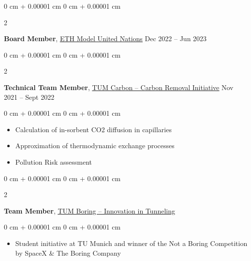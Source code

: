 \documentclass[10pt, letterpaper]{article}
\newenvironment{highlights}{
    \begin{itemize}[
        topsep=0.10 cm,
        parsep=0.10 cm,
        partopsep=0pt,
        itemsep=0pt,
        leftmargin=0 cm + 10pt
    ]
}{
    \end{itemize}
} %
\newenvironment{onecolentry}{
    \begin{adjustwidth}{
        0 cm + 0.00001 cm
    }{
        0 cm + 0.00001 cm
    }
}{
    \end{adjustwidth}
} %
\newenvironment{twocolentry}[2][]{
    \onecolentry
    \def\secondColumn{#2}
    \setcolumnwidth{\fill, 4.5 cm}
    \begin{paracol}{2}
}{
    \switchcolumn \raggedleft \secondColumn
    \end{paracol}
    \endonecolentry
} %
\begin{document}
        \vspace{0.2 cm}


        \begin{twocolentry}{
            Dec 2022 – Jun 2023
        }
            \textbf{Board Member}, \href{https://ethmun.org/}{\underline{ETH Model United Nations}}\end{twocolentry}



  
        \vspace{0.2 cm}

        \begin{twocolentry}{
            Nov 2021 – Sept 2022
        }
            \textbf{Technical Team Member}, \href{https://www.tumcarbon.com/}{\underline{TUM Carbon – Carbon Removal Initiative}}\end{twocolentry}

        \vspace{0.10 cm}
        \begin{onecolentry}
            \begin{highlights}
                \item Calculation of in-sorbent CO2 diffusion in capillaries
                \item Approximation of thermodynamic exchange processes
                \item Pollution Risk assessment
            \end{highlights}
        \end{onecolentry}

        \vspace{0.2 cm}

        \begin{twocolentry}{
            2021
        }
            \textbf{Team Member}, \href{https://tum-boring.com/}{\underline{TUM Boring – Innovation in Tunneling}}\end{twocolentry}

        \vspace{0.10 cm}
        \begin{onecolentry}
            \begin{highlights}
                \item Student initiative at TU Munich and winner of the Not a Boring Competition by SpaceX \& The Boring Company
            \end{highlights}
        \end{onecolentry}

        \vspace{0.2 cm}
\end{document}
